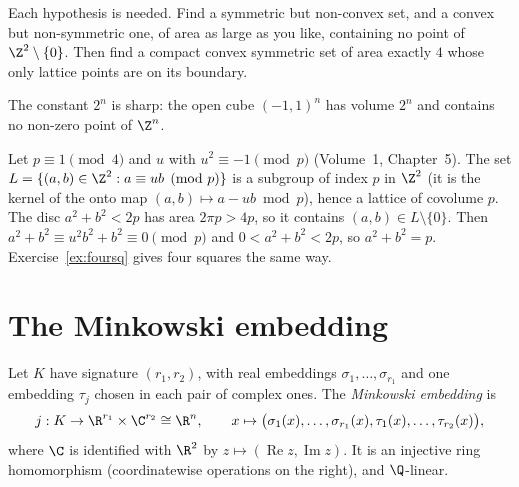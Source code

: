 \begin{think}
Each hypothesis is needed. Find a symmetric but non-convex set, and a convex but non-symmetric one, of area as large
as you like, containing no point of $\Z^2\setminus\{0\}$. Then find a compact convex symmetric set of area exactly $4$
whose only lattice points are on its boundary.
\end{think}

The constant $2^n$ is sharp: the open cube $(-1,1)^n$ has volume $2^n$ and contains no non-zero point of $\Z^n$.

\begin{example}\label{exa:twosq}
Let $p\equiv1\pmod 4$ and $u$ with $u^2\equiv-1\pmod p$ (Volume~1, Chapter~5). The set $L=\{(a,b)\in\Z^2:a\equiv ub\pmod p\}$
is a subgroup of index $p$ in $\Z^2$ (it is the kernel of the onto map $(a,b)\mapsto a-ub\bmod p$), hence a lattice of
covolume $p$. The disc $a^2+b^2<2p$ has area $2\pi p>4p$, so it contains $(a,b)\in L\setminus\{0\}$. Then $a^2+b^2\equiv
u^2b^2+b^2\equiv0\pmod p$ and $0<a^2+b^2<2p$, so $a^2+b^2=p$. Exercise~\ref{ex:foursq} gives four squares the same way.
\end{example}

\section{The Minkowski embedding}

Let $K$ have signature $(r_1,r_2)$, with real embeddings $\sigma_1,\dots,\sigma_{r_1}$ and one embedding $\tau_j$ chosen
in each pair of complex ones. The \emph{Minkowski embedding} is
\[
j:K\to\R^{r_1}\times\C^{r_2}\cong\R^n,\qquad x\mapsto\bigl(\sigma_1(x),\dots,\sigma_{r_1}(x),\tau_1(x),\dots,
\tau_{r_2}(x)\bigr),
\]
where $\C$ is identified with $\R^2$ by $z\mapsto(\operatorname{Re}z,\operatorname{Im}z)$. It is an injective ring
homomorphism (coordinatewise operations on the right), and $\Q$-linear.

